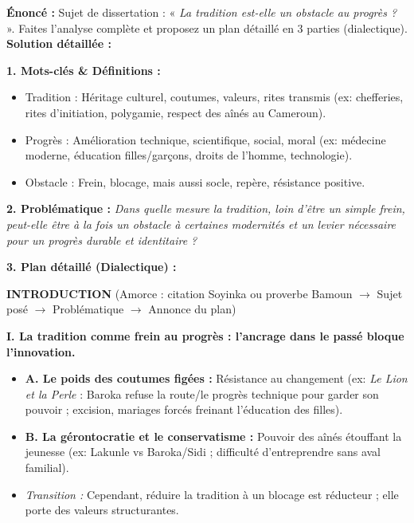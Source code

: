 \documentclass[11pt]{article}
\newcommand{\cle}[1]{{\popxbold\color{popdark}#1}}
\begin{document}
\begin{exoresolu}
\textbf{Énoncé :} Sujet de dissertation : « \emph{La tradition est-elle un obstacle au progrès ?} ». Faites l'analyse complète et proposez un plan détaillé en 3 parties (dialectique).
\tcblower
\textbf{Solution détaillée :}

\textbf{1. Mots-clés \& Définitions :}
\begin{itemize}
    \item \cle{Tradition} : Héritage culturel, coutumes, valeurs, rites transmis (ex: chefferies, rites d'initiation, polygamie, respect des aînés au Cameroun).
    \item \cle{Progrès} : Amélioration technique, scientifique, social, moral (ex: médecine moderne, éducation filles/garçons, droits de l'homme, technologie).
    \item \cle{Obstacle} : Frein, blocage, mais aussi socle, repère, résistance positive.
\end{itemize}

\textbf{2. Problématique :} \emph{Dans quelle mesure la tradition, loin d'être un simple frein, peut-elle être à la fois un obstacle à certaines modernités et un levier nécessaire pour un progrès durable et identitaire ?}

\textbf{3. Plan détaillé (Dialectique) :}

\textbf{INTRODUCTION} (Amorce : citation Soyinka ou proverbe Bamoun $\rightarrow$ Sujet posé $\rightarrow$ Problématique $\rightarrow$ Annonce du plan)

\textbf{I. La tradition comme frein au progrès : l'ancrage dans le passé bloque l'innovation.}
\begin{itemize}
    \item \textbf{A. Le poids des coutumes figées :} Résistance au changement (ex: \emph{Le Lion et la Perle} : Baroka refuse la route/le progrès technique pour garder son pouvoir ; excision, mariages forcés freinant l'éducation des filles).
    \item \textbf{B. La gérontocratie et le conservatisme :} Pouvoir des aînés étouffant la jeunesse (ex: Lakunle vs Baroka/Sidi ; difficulté d'entreprendre sans aval familial).
    \item \textit{Transition :} Cependant, réduire la tradition à un blocage est réducteur ; elle porte des valeurs structurantes.
\end{itemize}


\end{exoresolu}
\end{document}
